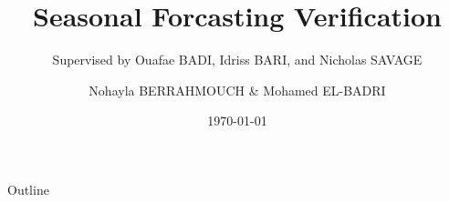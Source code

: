 \documentclass[11pt]{beamer}
\title[S-F]{Seasonal Forcasting Verification}
\author[BERRAHMOUCH \& EL-BADRI]{Nohayla BERRAHMOUCH  \& Mohamed EL-BADRI}
\institute[EHTP]{EHTP}
\date{\today}
\subtitle{Supervised by Ouafae BADI, Idriss BARI,  and Nicholas SAVAGE}
\begin{document}
\begin{frame}
	\maketitle
\end{frame}

\begin{frame}{Outline}
	\tableofcontents
\end{frame}









\end{document}
